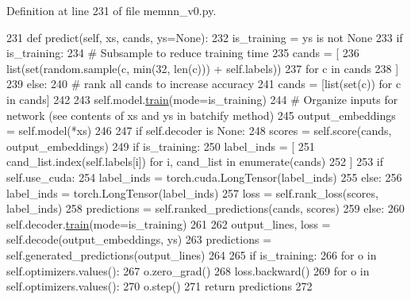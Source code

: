 Definition at line 231 of file memnn\+\_\+v0.\+py.


\begin{DoxyCode}
231     \textcolor{keyword}{def }predict(self, xs, cands, ys=None):
232         is\_training = ys \textcolor{keywordflow}{is} \textcolor{keywordflow}{not} \textcolor{keywordtype}{None}
233         \textcolor{keywordflow}{if} is\_training:
234             \textcolor{comment}{# Subsample to reduce training time}
235             cands = [
236                 list(set(random.sample(c, min(32, len(c))) + self.labels))
237                 \textcolor{keywordflow}{for} c \textcolor{keywordflow}{in} cands
238             ]
239         \textcolor{keywordflow}{else}:
240             \textcolor{comment}{# rank all cands to increase accuracy}
241             cands = [list(set(c)) \textcolor{keywordflow}{for} c \textcolor{keywordflow}{in} cands]
242 
243         self.model.\hyperlink{namespaceprojects_1_1mastering__the__dungeon_1_1mturk_1_1tasks_1_1MTD_1_1run_a36a5f4f6f9df0611a6818610518d2cf0}{train}(mode=is\_training)
244         \textcolor{comment}{# Organize inputs for network (see contents of xs and ys in batchify method)}
245         output\_embeddings = self.model(*xs)
246 
247         \textcolor{keywordflow}{if} self.decoder \textcolor{keywordflow}{is} \textcolor{keywordtype}{None}:
248             scores = self.score(cands, output\_embeddings)
249             \textcolor{keywordflow}{if} is\_training:
250                 label\_inds = [
251                     cand\_list.index(self.labels[i]) \textcolor{keywordflow}{for} i, cand\_list \textcolor{keywordflow}{in} enumerate(cands)
252                 ]
253                 \textcolor{keywordflow}{if} self.use\_cuda:
254                     label\_inds = torch.cuda.LongTensor(label\_inds)
255                 \textcolor{keywordflow}{else}:
256                     label\_inds = torch.LongTensor(label\_inds)
257                 loss = self.rank\_loss(scores, label\_inds)
258             predictions = self.ranked\_predictions(cands, scores)
259         \textcolor{keywordflow}{else}:
260             self.decoder.\hyperlink{namespaceprojects_1_1mastering__the__dungeon_1_1mturk_1_1tasks_1_1MTD_1_1run_a36a5f4f6f9df0611a6818610518d2cf0}{train}(mode=is\_training)
261 
262             output\_lines, loss = self.decode(output\_embeddings, ys)
263             predictions = self.generated\_predictions(output\_lines)
264 
265         \textcolor{keywordflow}{if} is\_training:
266             \textcolor{keywordflow}{for} o \textcolor{keywordflow}{in} self.optimizers.values():
267                 o.zero\_grad()
268             loss.backward()
269             \textcolor{keywordflow}{for} o \textcolor{keywordflow}{in} self.optimizers.values():
270                 o.step()
271         \textcolor{keywordflow}{return} predictions
272 
\end{DoxyCode}
